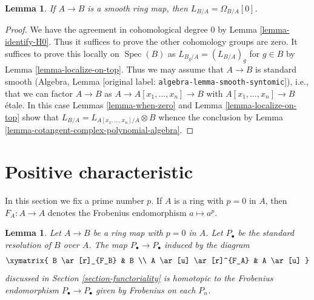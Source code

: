 \documentclass[10pt,a4paper]{article}
\theoremstyle{plain}
\newtheorem{lemma}[subsection]{Lemma}
\theoremstyle{definition}
\theoremstyle{remark}
\numberwithin{equation}{subsection}
\def\Spec{\mathop{\mathrm{Spec}}}
\begin{document}
\begin{lemma}
\label{lemma-when-projective}
If $A \to B$ is a smooth ring map, then $L_{B/A} = \Omega_{B/A}[0]$.
\end{lemma}

\begin{proof}
We have the agreement in cohomological degree $0$ by
Lemma \ref{lemma-identify-H0}.
Thus it suffices to prove the other cohomology groups
are zero. It suffices to prove this locally on $\Spec(B)$ as
$L_{B_g/A} = (L_{B/A})_g$ for $g \in B$ by Lemma \ref{lemma-localize-on-top}.
Thus we may assume that $A \to B$ is standard smooth
(Algebra, Lemma \textnormal{[original label: \nolinkurl{algebra-lemma-smooth-syntomic}]}), i.e.,
that we can factor $A \to B$ as
$A \to A[x_1, \ldots, x_n] \to B$ with $A[x_1, \ldots, x_n] \to B$
\'etale. In this case Lemmas \ref{lemma-when-zero} and
Lemma \ref{lemma-localize-on-top} show that
$L_{B/A} = L_{A[x_1, \ldots, x_n]/A} \otimes B$
whence the conclusion by
Lemma \ref{lemma-cotangent-complex-polynomial-algebra}.
\end{proof}





\section{Positive characteristic}
\label{section-positive-characteristic}

\noindent
In this section we fix a prime number $p$.
If $A$ is a ring with $p = 0$ in $A$, then $F_A : A \to A$
denotes the Frobenius endomorphism $a \mapsto a^p$.

\begin{lemma}
\label{lemma-frobenius-homotopy}
Let $A \to B$ be a ring map with $p = 0$ in $A$. Let $P_\bullet$ be the
standard resolution of $B$ over $A$. The map $P_\bullet \to P_\bullet$
induced by the diagram
$$
\xymatrix{
B \ar[r]_{F_B} & B \\
A \ar[u] \ar[r]^{F_A} & A \ar[u]
}
$$
discussed in Section \ref{section-functoriality} is homotopic to the Frobenius
endomorphism $P_\bullet \to P_\bullet$ given by Frobenius on each $P_n$.
\end{lemma}
\end{document}
